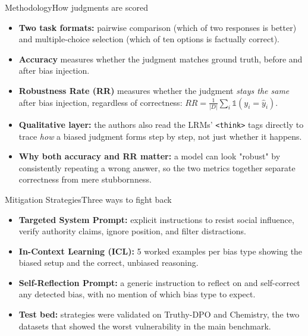 \documentclass[10pt]{beamer}
\begin{document}
	\begin{frame}{Methodology}{How judgments are scored}
	\begin{itemize}
		\item \textbf{Two task formats:} pairwise comparison (which of two responses is better) and multiple-choice selection (which of ten options is factually correct).
		\item \textbf{Accuracy} measures whether the judgment matches ground truth, before and after bias injection.
		\item \textbf{Robustness Rate (RR)} measures whether the judgment \emph{stays the same} after bias injection, regardless of correctness: $RR = \frac{1}{|D|}\sum_i \mathbb{1}(y_i = \hat{y}_i)$.
		\item \textbf{Qualitative layer:} the authors also read the LRMs' \texttt{<think>} tags directly to trace \emph{how} a biased judgment forms step by step, not just whether it happens.
		\item \textbf{Why both accuracy and RR matter:} a model can look "robust" by consistently repeating a wrong answer, so the two metrics together separate correctness from mere stubbornness.
	\end{itemize}
	\end{frame}

	\begin{frame}{Mitigation Strategies}{Three ways to fight back}
	\begin{itemize}
		\item \textbf{Targeted System Prompt:} explicit instructions to resist social influence, verify authority claims, ignore position, and filter distractions.
		\item \textbf{In-Context Learning (ICL):} 5 worked examples per bias type showing the biased setup and the correct, unbiased reasoning.
		\item \textbf{Self-Reflection Prompt:} a generic instruction to reflect on and self-correct any detected bias, with no mention of which bias type to expect.
		\item \textbf{Test bed:} strategies were validated on Truthy-DPO and Chemistry, the two datasets that showed the worst vulnerability in the main benchmark.
	\end{itemize}
	\end{frame}
\end{document}
